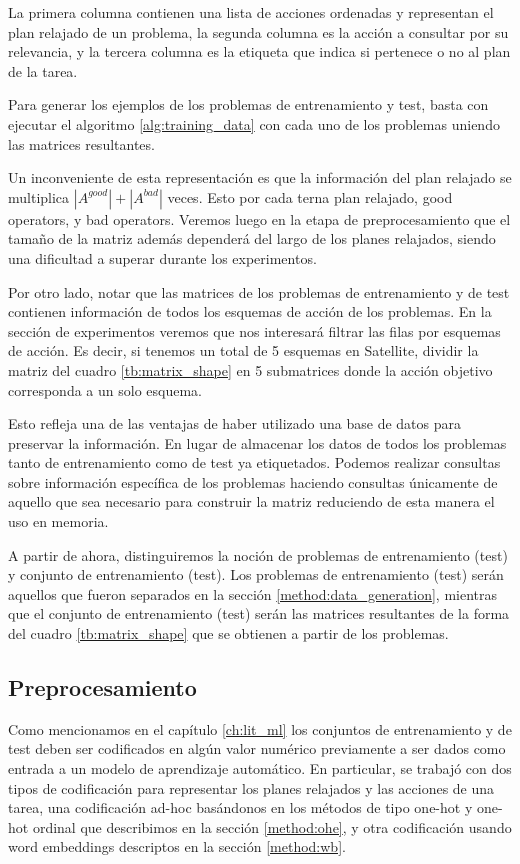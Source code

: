 La primera columna contienen una lista de acciones ordenadas y representan el
plan relajado de un problema, la segunda columna es la acción a consultar por su
relevancia, y la tercera columna es la etiqueta que indica si pertenece o no
al plan de la tarea.

Para generar los ejemplos de los problemas de entrenamiento y test, basta
con ejecutar el algoritmo \ref{alg:training_data} con cada uno de los problemas
uniendo las matrices resultantes.

Un inconveniente de esta representación es que la información del plan relajado
se multiplica $|A^{good}| + |A^{bad}|$ veces. Esto por cada terna plan relajado,
good operators, y bad operators. Veremos luego en la etapa de preprocesamiento
que el tamaño de la matriz además dependerá del largo de los planes relajados,
siendo una dificultad a superar durante los experimentos.

Por otro lado, notar que las matrices de los problemas de entrenamiento y de
test contienen información de todos los esquemas de acción de los problemas. En
la sección de experimentos veremos que nos interesará filtrar las filas por
esquemas de acción. Es decir, si tenemos un total de 5 esquemas en Satellite,
dividir la matriz del cuadro \ref{tb:matrix_shape} en 5 submatrices donde la
acción objetivo corresponda a un solo esquema.

Esto refleja una de las ventajas de haber utilizado una base de datos para
preservar la información. En lugar de almacenar los datos de todos los problemas
tanto de entrenamiento como de test ya etiquetados. Podemos realizar consultas
sobre información específica de los problemas haciendo consultas únicamente de
aquello que sea necesario para construir la matriz reduciendo de esta manera el
uso en memoria.

A partir de ahora, distinguiremos la noción de problemas de entrenamiento (test)
y conjunto de entrenamiento (test). Los problemas de entrenamiento (test) serán
aquellos que fueron separados en la sección \ref{method:data_generation},
mientras que el conjunto de entrenamiento (test) serán las matrices resultantes
de la forma del cuadro \ref{tb:matrix_shape} que se obtienen a partir de los
problemas.

\subsection{Preprocesamiento}
\label{method:preprocessing}

Como mencionamos en el capítulo \ref{ch:lit_ml} los conjuntos de entrenamiento y
de test deben ser codificados en algún valor numérico previamente a ser dados
como entrada a un modelo de aprendizaje automático. En particular, se trabajó con
dos tipos de codificación para representar los planes relajados y las acciones
de una tarea, una codificación ad-hoc basándonos en los métodos de tipo one-hot
y one-hot ordinal que describimos en la sección \ref{method:ohe}, y otra
codificación usando word embeddings descriptos en la sección \ref{method:wb}.

